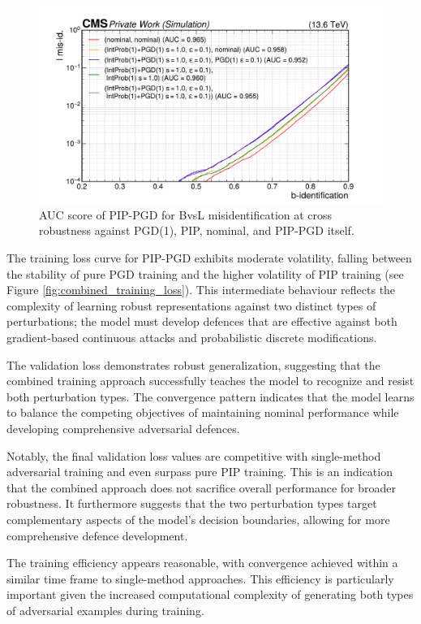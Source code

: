 \begin{figure}[h]
\centering
    \includegraphics[width=12cm]{media/output/roc_bvsl_combined_crossing.pdf}
    \caption{AUC score of PIP-PGD for BvsL misidentification at cross robustness against PGD(1), PIP, nominal, and PIP-PGD itself.}
    \label{fig:joint_training_crossing}
\end{figure}

The training loss curve for PIP-PGD exhibits moderate volatility, falling between the stability of pure PGD training and the higher volatility of PIP training (see Figure \ref{fig:combined_training_loss}). This intermediate behaviour reflects the complexity of learning robust representations against two distinct types of perturbations; the model must develop defences that are effective against both gradient-based continuous attacks and probabilistic discrete modifications.

The validation loss demonstrates robust generalization, suggesting that the combined training approach successfully teaches the model to recognize and resist both perturbation types. The convergence pattern indicates that the model learns to balance the competing objectives of maintaining nominal performance while developing comprehensive adversarial defences.

Notably, the final validation loss values are competitive with single-method adversarial training and even surpass pure PIP training. This is an indication that the combined approach does not sacrifice overall performance for broader robustness. It furthermore suggests that the two perturbation types target complementary aspects of the model's decision boundaries, allowing for more comprehensive defence development.

The training efficiency appears reasonable, with convergence achieved within a similar time frame to single-method approaches. This efficiency is particularly important given the increased computational complexity of generating both types of adversarial examples during training.



